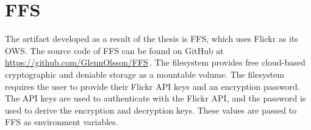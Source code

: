 \section{FFS}
\label{sec:res_ffs}
The artifact developed as a result of the thesis is \gls{FFS}, which uses Flickr as its \gls{OWS}. The source code of \gls{FFS} can be found on GitHub at \url{https://github.com/GlennOlsson/FFS}\,\cite{olssonFejkFileSystem2022}. The filesystem provides free \mbox{cloud-based} cryptographic and deniable storage as a mountable volume. The filesystem requires the user to provide their Flickr \gls{API} keys and an encryption password. The \gls{API} keys are used to authenticate with the Flickr \gls{API}, and the password is used to derive the encryption and decryption keys. These values are passed to \gls{FFS} as environment variables.